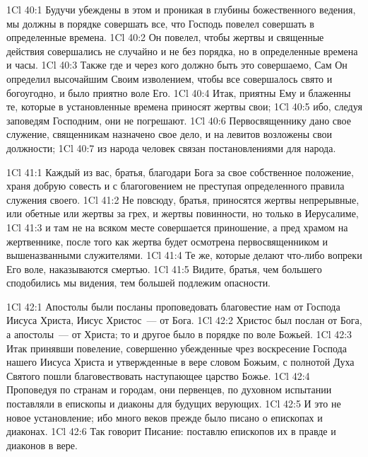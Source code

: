 \vs 1Cl 40:1
Будучи убеждены в этом и
проникая в глубины божественного ведения, мы должны в порядке совершать все,
что Господь повелел совершать в определенные времена.
\vs 1Cl 40:2
Он повелел, чтобы жертвы и
священные действия совершались не случайно и не без порядка, но в определенные
времена и часы.
\vs 1Cl 40:3
Также где и через кого
должно быть это совершаемо, Сам Он определил высочайшим Своим изволением,
чтобы все совершалось свято и богоугодно, и было приятно воле Его.
\vs 1Cl 40:4
Итак, приятны Ему и
блаженны те, которые в установленные времена приносят жертвы свои;
\vs 1Cl 40:5
ибо, следуя заповедям
Господним, они не погрешают.
\vs 1Cl 40:6
Первосвященнику дано свое
служение, священникам назначено свое дело, и на левитов возложены свои
должности;
\vs 1Cl 40:7
из народа человек связан
постановлениями для народа.

\vs 1Cl 41:1
Каждый из вас, братья,
благодари Бога за свое собственное положение, храня добрую совесть и с
благоговением не преступая определенного правила служения своего.
\vs 1Cl 41:2
Не повсюду, братья,
приносятся жертвы непрерывные, или обетные или жертвы за грех, и жертвы
повинности, но только в Иерусалиме,
\vs 1Cl 41:3
и там не на всяком месте
совершается приношение, а пред храмом на жертвеннике, после того как жертва
будет осмотрена первосвященником и вышеназванными служителями.
\vs 1Cl 41:4
Те же, которые делают
что-либо вопреки Его воле, наказываются смертью.
\vs 1Cl 41:5
Видите, братья, чем
большего сподобились мы видения, тем большей подлежим опасности.

\vs 1Cl 42:1
Апостолы были посланы
проповедовать благовестие нам от Господа Иисуса Христа, Иисус Христос~--- от
Бога.
\vs 1Cl 42:2
Христос был послан от
Бога, а апостолы~--- от Христа; то и другое было в порядке по воле Божьей.
\vs 1Cl 42:3
Итак принявши повеление,
совершенно убежденные чрез воскресение Господа нашего Иисуса Христа и
утвержденные в вере словом Божьим, с полнотой Духа Святого пошли
благовествовать наступающее царство Божье.
\vs 1Cl 42:4
Проповедуя по странам и
городам, они первенцев, по духовном испытании поставляли в епископы и диаконы
для будущих верующих.
\vs 1Cl 42:5
И это не новое
установление; ибо много веков прежде было писано о епископах и диаконах.
\vs 1Cl 42:6
Так говорит Писание:
поставлю епископов их в правде и диаконов в вере.

